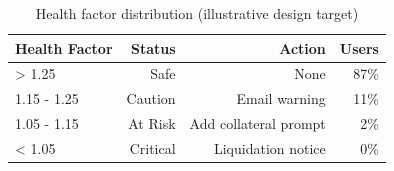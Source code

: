 \begin{table}[h]
\centering
\begin{tabular}{@{}lrrr@{}}
\toprule
\textbf{Health Factor} & \textbf{Status} & \textbf{Action} & \textbf{Users} \\ \midrule
> 1.25 & Safe & None & 87\% \\
1.15 - 1.25 & Caution & Email warning & 11\% \\
1.05 - 1.15 & At Risk & Add collateral prompt & 2\% \\
< 1.05 & Critical & Liquidation notice & 0\% \\ \bottomrule
\end{tabular}
\caption{Health factor distribution (illustrative design target)}
\end{table}

